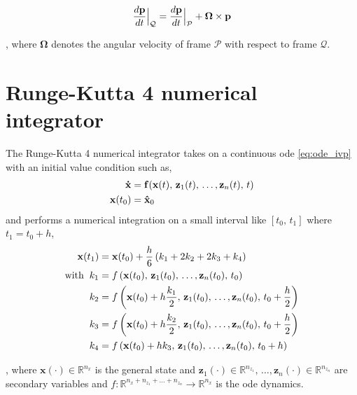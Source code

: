 \begin{equation}
	\frac{d \mathbf{p}}{dt}\Bigr|_{\mathcal{Q}} = \frac{d \mathbf{p}}{dt}\Bigr|_{\mathcal{P}} + \mathbf{\Omega} \times \mathbf{p} 
	\label{eq:vectorDiff2}
\end{equation} 

\noindent, where $\bm{\Omega}$ denotes the angular velocity of frame $\mathcal{P}$ with respect to frame $\mathcal{Q}$.

\section{Runge-Kutta 4 numerical integrator}
\label{section:rk4}

The Runge-Kutta 4 numerical integrator takes on a continuous \acrshort{ode} \ref{eq:ode_ivp} with an initial value condition such as,
\begin{subequations} \label{eq:ode_ivp}
	\begin{align}
		\mathbf{\dot{x}} &= \mathbf{f}(\mathbf{x}(t),\,\mathbf{z}_1(t),\,\ldots,\mathbf{z}_n(t),\,t) \label{subeq:ode_dynamics} \\
		\mathbf{x}(t_0) &= \mathbf{\hat{x}}_0 \label{subeq:ode_initialcond}
	\end{align}
\end{subequations}
and performs a numerical integration on a small interval like $\left[t_0,\,t_1\right]$ where $t_1 = t_0 + h$,
\begin{equation}
\begin{aligned}
\mathbf{x}(t_1) &= \mathbf{x}(t_0) + \frac{h}{6}\left(k_1 + 2k_2 + 2k_3+ k_4\right)\\
\text{with} \hspace{2mm} k_1 &= f\left( \mathbf{x}(t_0),\,\mathbf{z}_1(t_0),\,\ldots,\mathbf{z}_n(t_0),\,t_0 \right)\\
k_2 &= f\left( \mathbf{x}(t_0) + h \frac{k_1}{2},\,\mathbf{z}_1(t_0),\,\ldots,\mathbf{z}_n(t_0),\,t_0+\frac{h}{2} \right)\\
k_3 &= f\left( \mathbf{x}(t_0) + h \frac{k_2}{2},\,\mathbf{z}_1(t_0),\,\ldots,\mathbf{z}_n(t_0),\,t_0+\frac{h}{2} \right)\\
k_4 &= f\left( \mathbf{x}(t_0) + h k_3,\,\mathbf{z}_1(t_0),\,\ldots,\mathbf{z}_n(t_0),\,t_0+h \right)\\
\end{aligned}
\label{eq:rk4}
\end{equation}

\noindent, where $\mathbf{x}(\cdot) \in \mathbb{R}^{n_x}$ is the general state and $\mathbf{z}_1(\cdot) \in \mathbb{R}^{n_{z_1}},\,\ldots,\mathbf{z}_n(\cdot) \in \mathbb{R}^{n_{z_n}}$ are secondary variables and $f:\mathbb{R}^{n_x + n_{z_1} + \ldots+n_{z_n}} \to \mathbb{R}^{n_x}$ is the \acrshort{ode} dynamics.

